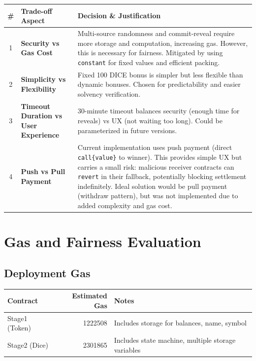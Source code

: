 \documentclass[10pt,a4paper]{article}
\begin{document}
\begin{table}[H]
\centering
\begin{tabularx}{\textwidth}{c X X}
\toprule
\textbf{\#} & \textbf{Trade-off Aspect} & \textbf{Decision \& Justification} \\
\midrule
1 & \textbf{Security vs Gas Cost} & Multi-source randomness and commit-reveal require more storage and computation, increasing gas. However, this is necessary for fairness. Mitigated by using \texttt{constant} for fixed values and efficient packing. \\
2 & \textbf{Simplicity vs Flexibility} & Fixed 100 DICE bonus is simpler but less flexible than dynamic bonuses. Chosen for predictability and easier solvency verification. \\
3 & \textbf{Timeout Duration vs User Experience} & 30-minute timeout balances security (enough time for reveals) vs UX (not waiting too long). Could be parameterized in future versions. \\
4 & \textbf{Push vs Pull Payment} & Current implementation uses push payment (direct \texttt{call\{value\}} to winner). This provides simple UX but carries a small risk: malicious receiver contracts can \texttt{revert} in their fallback, potentially blocking settlement indefinitely. Ideal solution would be pull payment (withdraw pattern), but was not implemented due to added complexity and gas cost. \\
\bottomrule
\end{tabularx}
\end{table}

\section{Gas and Fairness Evaluation}

\subsection*{Deployment Gas}

\begin{table}[H]
\centering
\begin{tabularx}{\textwidth}{X r X}
\toprule
\textbf{Contract} & \textbf{Estimated Gas} & \textbf{Notes} \\
\midrule
Stage1 (Token) & 1222508 & Includes storage for balances, name, symbol \\
Stage2 (Dice) & 2301865 & Includes state machine, multiple storage variables \\
\bottomrule
\end{tabularx}
\end{table}
\end{document}

